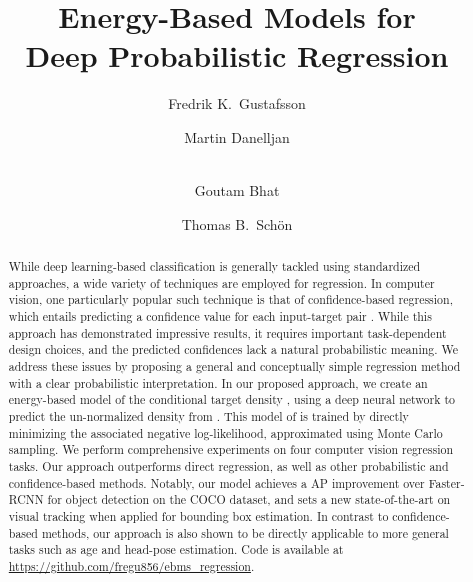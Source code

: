 \documentclass[runningheads]{llncs}
\begin{document}
\pagestyle{headings}
\mainmatter
\def\ECCVSubNumber{3472}  

\title{Energy-Based Models for\\ Deep Probabilistic Regression} 

\begin{comment}
\titlerunning{ECCV-20 submission ID \ECCVSubNumber} 
\authorrunning{ECCV-20 submission ID \ECCVSubNumber} 
\author{Anonymous ECCV submission}
\institute{Paper ID \ECCVSubNumber}
\end{comment}


\author{Fredrik K.~Gustafsson \and
Martin Danelljan \and\\
Goutam Bhat \and
Thomas B.~Sch\"on}
\maketitle

\begin{abstract}
While deep learning-based classification is generally tackled using standardized approaches, a wide variety of techniques are employed for regression. In computer vision, one particularly popular such technique is that of confidence-based regression, which entails predicting a confidence value for each input-target pair . While this approach has demonstrated impressive results, it requires important task-dependent design choices, and the predicted confidences lack a natural probabilistic meaning. We address these issues by proposing a general and conceptually simple regression method with a clear probabilistic interpretation. In our proposed approach, we create an energy-based model of the conditional target density , using a deep neural network to predict the un-normalized density from . This model of  is trained by directly minimizing the associated negative log-likelihood, approximated using Monte Carlo sampling. We perform comprehensive experiments on four computer vision regression tasks. Our approach outperforms direct regression, as well as other probabilistic and confidence-based methods. Notably, our model achieves a  AP improvement over Faster-RCNN for object detection on the COCO dataset, and sets a new state-of-the-art on visual tracking when applied for bounding box estimation. In contrast to confidence-based methods, our approach is also shown to be directly applicable to more general tasks such as age and head-pose estimation. Code is available at \url{https://github.com/fregu856/ebms_regression}.
\end{abstract}
\end{document}

